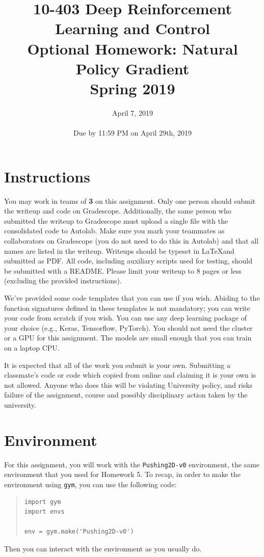 \documentclass[12pt]{article}
\title{10-403 Deep Reinforcement Learning and Control\\
  Optional Homework: Natural Policy Gradient\\
  Spring 2019\\
}
\date{April 7, 2019\\
  \hspace{1cm}\\
Due by 11:59 PM on April 29th, 2019}
\begin{document}
\maketitle
\noindent
\section*{Instructions}

You may work in teams of \textbf{3} on this assignment. Only one person should submit the writeup and code on Gradescope. Additionally, the same person who submitted the writeup to Gradescope must upload a single file with the consolidated code to Autolab.  Make sure you mark your teammates as collaborators on Gradescope (you do not need to do this in Autolab) and that all names are listed in the writeup.  Writeups should be typeset in \LaTeX and submitted as PDF. All code, including auxiliary scripts used for testing, should be submitted with a README.  Please limit your writeup to 8 pages or less (excluding the provided instructions).

We've provided some code templates that you can use if you wish. Abiding to the function signatures defined in these templates is not mandatory; you can write your code from scratch if you wish. You can use any deep learning package of your choice (e.g., Keras, Tensorflow, PyTorch). You should not need the cluster or a GPU for this assignment. The models are small enough that you can train on a laptop CPU.

It is expected that all of the work you submit is your own. Submitting a classmate's code or code which copied from online and claiming it is your own is not allowed. Anyone who does this will be violating University policy, and risks failure of the assignment, course and possibly disciplinary action taken by the university.

\section*{Environment}
For this assignment, you will work with the \texttt{Pushing2D-v0} environment, the same environment that you used for Homework 5.  To recap, in order to make the environment using \texttt{gym}, you can use the following code:
\begin{quote}
\begin{verbatim}
import gym
import envs

env = gym.make('Pushing2D-v0')
\end{verbatim}
\end{quote}
Then you can interact with the environment as you usually do.
\end{document}
